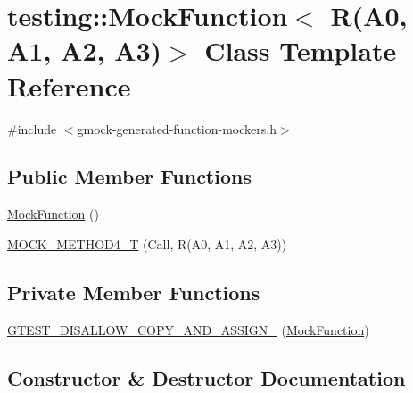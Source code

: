 \hypertarget{classtesting_1_1_mock_function_3_01_r_07_a0_00_01_a1_00_01_a2_00_01_a3_08_4}{}\section{testing\+::Mock\+Function$<$ R(A0, A1, A2, A3)$>$ Class Template Reference}
\label{classtesting_1_1_mock_function_3_01_r_07_a0_00_01_a1_00_01_a2_00_01_a3_08_4}


{\ttfamily \#include $<$gmock-\/generated-\/function-\/mockers.\+h$>$}

\subsection*{Public Member Functions}
\begin{DoxyCompactItemize}
\item 
\mbox{\hyperlink{classtesting_1_1_mock_function_3_01_r_07_a0_00_01_a1_00_01_a2_00_01_a3_08_4_abf2185b2c08c575374074520778f574a}{Mock\+Function}} ()
\item 
\mbox{\hyperlink{classtesting_1_1_mock_function_3_01_r_07_a0_00_01_a1_00_01_a2_00_01_a3_08_4_ad158c25a1b33cb53bae3f0eb9df0d59c}{M\+O\+C\+K\+\_\+\+M\+E\+T\+H\+O\+D4\+\_\+T}} (Call, R(A0, A1, A2, A3))
\end{DoxyCompactItemize}
\subsection*{Private Member Functions}
\begin{DoxyCompactItemize}
\item 
\mbox{\hyperlink{classtesting_1_1_mock_function_3_01_r_07_a0_00_01_a1_00_01_a2_00_01_a3_08_4_acf683aa1f865a8e7539d02bfb8fa5ff8}{G\+T\+E\+S\+T\+\_\+\+D\+I\+S\+A\+L\+L\+O\+W\+\_\+\+C\+O\+P\+Y\+\_\+\+A\+N\+D\+\_\+\+A\+S\+S\+I\+G\+N\+\_\+}} (\mbox{\hyperlink{classtesting_1_1_mock_function}{Mock\+Function}})
\end{DoxyCompactItemize}


\subsection{Constructor \& Destructor Documentation}
\mbox{\label{classtesting_1_1_mock_function_3_01_r_07_a0_00_01_a1_00_01_a2_00_01_a3_08_4_abf2185b2c08c575374074520778f574a}} 
